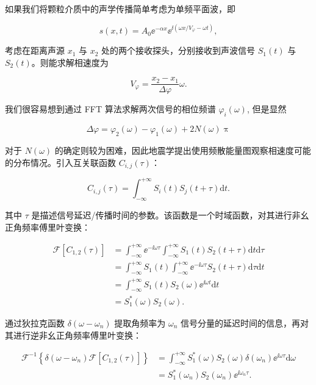 如果我们将颗粒介质中的声学传播简单考虑为单频平面波，即

\begin{equation}
  s(x,t) = A_{0}{\ee}^{-\alpha x}{\ee}^{\ii(\omega x/V_{\varphi}-\omega t)},
  \label{eq:spherical_wave}
\end{equation}

考虑在距离声源 $x_{1}$ 与 $x_{2}$ 处的两个接收探头，分别接收到声波信号 $S_{1}(t)$ 与 $S_{2}(t)$。则能求解相速度为

\begin{equation}
  V_{\varphi} = \frac{x_{2}-x_{1}}{\Delta \varphi}\omega.
\end{equation}

我们很容易想到通过 FFT 算法求解两次信号的相位频谱 $\varphi_{i}(\omega)$, 但是显然

\begin{equation}
  \Delta \varphi = \varphi_{2}(\omega) - \varphi_{1}(\omega) + 2N(\omega)\uppi
\end{equation}

对于 $N(\omega)$ 的确定则较为困难，因此地震学提出使用频散能量图观察相速度可能的分布情况。引入互关联函数 $C_{i,j}(\tau)$：

\begin{equation}
  C_{i,j}(\tau) = \int_{-\infty}^{+\infty}S_{i}(t)S_{j}(t+\tau)\mathrm{d}t.
\end{equation}

其中 $\tau$ 是描述信号延迟/传播时间的参数。该函数是一个时域函数，对其进行非幺正角频率傅里叶变换：

\begin{align}
  \mathcal{F}[C_{1,2}(\tau)] &= \int_{-\infty}^{+\infty}{\ee}^{-\ii\omega\tau}\int_{-\infty}^{+\infty}S_{1}(t)S_{2}(t+\tau)\mathrm{d}t\mathrm{d}\tau \nonumber \\
  &= \int_{-\infty}^{+\infty}S_{1}(t)\int_{-\infty}^{+\infty}{\ee}^{-\ii\omega\tau}S_{2}(t+\tau)\mathrm{d}\tau\mathrm{d}t \nonumber \\
  &= \int_{-\infty}^{+\infty}S_{1}(t)S_{2}(\omega){\ee}^{\ii\omega t}\mathrm{d}t \nonumber \\
  &= S_{1}^{*}(\omega)S_{2}(\omega).
\end{align}

通过狄拉克函数 $\delta(\omega-\omega_{n})$ 提取角频率为 $\omega_{n}$ 信号分量的延迟时间的信息，再对其进行逆非幺正角频率傅里叶变换：

\begin{align}
  \mathcal{F}^{-1}\left\{\delta(\omega-\omega_{n})\mathcal{F}[C_{1,2}(\tau)]\right\} &= \int_{-\infty}^{+\infty}S_{1}^{*}(\omega)S_{2}(\omega)\delta(\omega_{n}){\ee}^{\ii\omega\tau}\mathrm{d}\omega \nonumber \\
  &= S_{1}^{*}(\omega_{n})S_{2}(\omega_{n}){\ee}^{\ii\omega_{n}\tau}.
\end{align}

